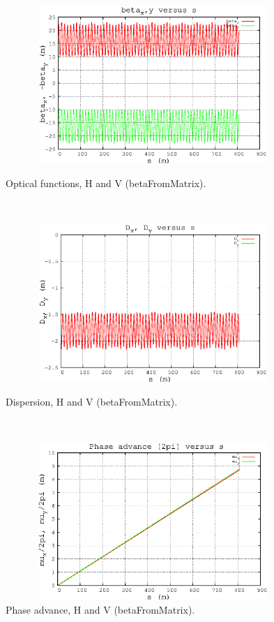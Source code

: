 \documentclass[11pt]{article}
\begin{document}
 
 \begin{figure}[h]
 
 \centering
 
 ~
 ~
 
 \includegraphics*[width=17cm,height=6cm]{gnuplot_betxy.eps}
 \vspace{-2ex}
 \caption{ \label{Figbetxy}
 Optical functions, H and V (betaFromMatrix).
 }
 
 
 ~
 ~
 
 \includegraphics*[width=17cm,height=6cm]{gnuplot_Dxy.eps}
 \vspace{-2ex}
 \caption{ \label{FigDxy}
 Dispersion, H and V (betaFromMatrix).
 }
 
 
 ~
 ~
 
 \includegraphics*[width=17cm,height=6cm]{gnuplot_muxy.eps}
 \vspace{-2ex}
 \caption{ \label{Figmuxy}
 Phase advance, H and V (betaFromMatrix).
 }
 
 \end{figure}
                                                                                                                                     
                                                                                                                                     
                                                                                 
 
\end{document}
